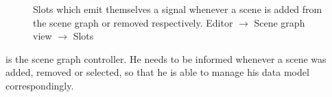 \documentclass[%
    a4paper,    %
    justified,  %
    nobib,      %
    openany     %
]{tufte-book}
\makeatletter
\renewcommand{\label}[1]{\@tufte@label{##1}}%
\makeatother
\begin{document}
\begin{figure}[!htbp]
\begin{flushleft}
\begin{minipage}{\linewidth}
\begin{list}{}{\setlength{\itemsep}{-\parsep}\setlength{\itemindent}{-\leftmargin}}
\item{}
\end{list}
\end{minipage}\vspace{4ex}
\end{flushleft}
\caption{Slots which emit themselves a signal whenever a scene is added from the
  scene graph or removed respectively.
  \newline{}\newline{}Editor $\rightarrow$ Scene graph view
  $\rightarrow$ Slots}
\end{figure}

 is the
scene graph controller. He needs to be informed whenever a scene was added,
removed or selected, so that he is able to manage his data model
correspondingly.
\end{document}

